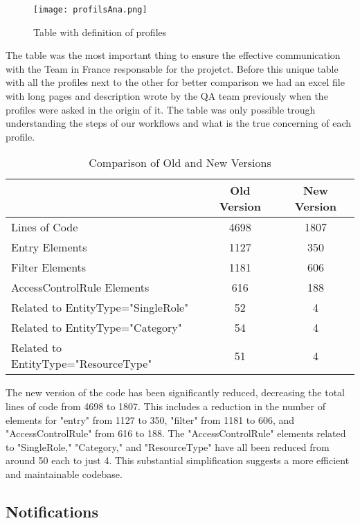 \begin{figure}
    \centering
    \texttt{[image: profilsAna.png]}
    \caption{Table with definition of profiles}
    \label{fig:enter-label}
\end{figure}

The table was the most important thing to ensure the effective communication with the Team in France responsable for the projetct. Before this unique table with all the profiles next to the other for better comparison we had an excel file with long pages and description wrote by the QA team previously when the profiles were asked in the origin of it. The table was only possible trough understanding the steps of our workflows and what is the true concerning of each profile.

\begin{table}[h]
    \centering
    \begin{tabular}{lcc}
        \toprule
        & \textbf{Old Version} & \textbf{New Version} \\
        \midrule
        Lines of Code & 4698 & 1807 \\
        \midrule
        Entry Elements & 1127 & 350 \\
        Filter Elements & 1181 & 606 \\
        AccessControlRule Elements & 616 & 188 \\
        \quad Related to EntityType="SingleRole" & 52 & 4 \\
        \quad Related to EntityType="Category" & 54 & 4 \\
        \quad Related to EntityType="ResourceType" & 51 & 4 \\
        \bottomrule
    \end{tabular}
    \caption{Comparison of Old and New Versions}
    \label{tab:comparison}
\end{table}

The new version of the code has been significantly reduced, decreasing the total lines of code from 4698 to 1807. This includes a reduction in the number of elements for "entry" from 1127 to 350, "filter" from 1181 to 606, and "AccessControlRule" from 616 to 188. The "AccessControlRule" elements related to "SingleRole," "Category," and "ResourceType" have all been reduced from around 50 each to just 4. This substantial simplification suggests a more efficient and maintainable codebase.

\subsection{Notifications}

